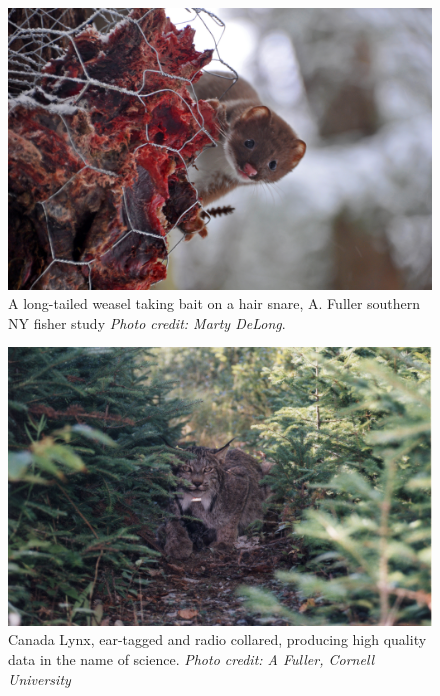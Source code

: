\begin{figure}[h!]
\centering
\includegraphics[width=\textwidth]{Ch20-Last/weasel.jpg}
\caption{
A long-tailed weasel taking bait on a hair snare, A. Fuller southern NY fisher study
{\it Photo credit: Marty DeLong}.
}
\label{last.fig.weasels}
\end{figure}



\begin{figure}[h!]
\centering
\includegraphics[width=\textwidth]{Ch20-Last/lynx.jpg}
\caption{
Canada Lynx, ear-tagged and radio collared, producing high quality
data in the name of science.
{\it Photo credit: A Fuller, Cornell University} }
\label{last.fig.lynx}
\end{figure}

